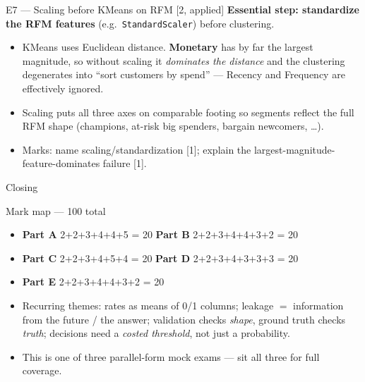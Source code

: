\documentclass[aspectratio=169,11pt]{beamer}
\begin{document}
\begin{frame}{E7 --- Scaling before KMeans on RFM \hfill [2, applied]}
\textbf{Essential step: standardize the RFM features} (e.g.\ \texttt{StandardScaler}) before clustering.
\begin{itemize}
  \item KMeans uses Euclidean distance. \textbf{Monetary} has by far the largest magnitude, so without scaling it \emph{dominates the distance} and the clustering degenerates into ``sort customers by spend'' --- Recency and Frequency are effectively ignored.
  \item Scaling puts all three axes on comparable footing so segments reflect the full RFM shape (champions, at-risk big spenders, bargain newcomers, \dots).
  \item Marks: name scaling/standardization [1]; explain the largest-magnitude-feature-dominates failure [1].
\end{itemize}
\end{frame}

\begin{frame}{Closing}
\begin{block}{Mark map --- 100 total}
\begin{itemize}
  \item \textbf{Part A} 2+2+3+4+4+5 = 20 \quad \textbf{Part B} 2+2+3+4+4+3+2 = 20
  \item \textbf{Part C} 2+2+3+4+5+4 = 20 \quad \textbf{Part D} 2+2+3+4+3+3+3 = 20
  \item \textbf{Part E} 2+2+3+4+4+3+2 = 20
\end{itemize}
\end{block}
\begin{itemize}
  \item Recurring themes: rates as means of 0/1 columns; leakage $=$ information from the future / the answer; validation checks \emph{shape}, ground truth checks \emph{truth}; decisions need a \emph{costed threshold}, not just a probability.
  \item This is one of three parallel-form mock exams --- sit all three for full coverage.
\end{itemize}
\end{frame}
\end{document}
